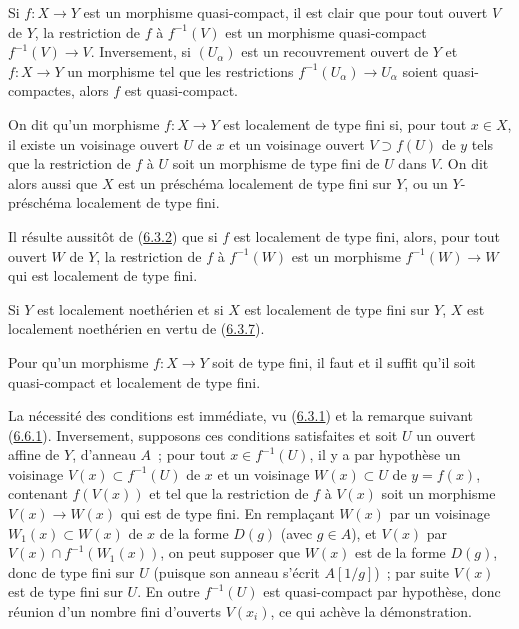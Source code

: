 Si $f:X\to Y$ est un morphisme quasi-compact, il est clair que pour tout
ouvert $V$ de $Y$, la restriction de $f$ à $f^{-1}(V)$ est un morphisme
quasi-compact $f^{-1}(V)\to V$. Inversement, si $(U_\alpha)$ est un
recouvrement ouvert de $Y$ et $f:X\to Y$ un morphisme tel que les restrictions
$f^{-1}(U_\alpha)\to U_\alpha$ soient quasi-compactes, alors $f$ est
quasi-compact.

\begin{definition}[6.6.2]
\label{I.6.6.2-fr}
On dit qu'un morphisme $f:X\to Y$ est localement de type fini si, pour
tout $x\in X$, il existe un voisinage ouvert $U$ de $x$ et un voisinage ouvert
$V\supset f(U)$ de $y$ tels que la
restriction de $f$ à $U$ soit un morphisme de type fini de $U$ dans $V$. On
dit alors aussi que $X$ est un préschéma localement de type fini sur $Y$, ou
un $Y$-préschéma localement de type fini.
\end{definition}

Il résulte aussitôt de (\hyperref[I.6.3.2-fr]{6.3.2}) que si $f$ est
localement de type fini, alors, pour tout ouvert $W$ de $Y$, la restriction
de $f$ à $f^{-1}(W)$ est un morphisme $f^{-1}(W)\to W$ qui est localement de
type fini.

Si $Y$ est localement noethérien et si $X$ est localement de type fini sur
$Y$, $X$ est localement noethérien en vertu de
(\hyperref[I.6.3.7-fr]{6.3.7}).

\begin{proposition}[6.6.3]
\label{I.6.6.3-fr}
Pour qu'un morphisme $f:X\to Y$ soit de type fini, il faut et il suffit qu'il
soit quasi-compact et localement de type fini.
\end{proposition}

La nécessité des conditions est immédiate, vu
(\hyperref[I.6.3.1-fr]{6.3.1}) et la remarque suivant
(\hyperref[I.6.6.1-fr]{6.6.1}). Inversement, supposons ces conditions
satisfaites et soit $U$ un ouvert affine de $Y$, d'anneau $A$~; pour tout
$x\in f^{-1}(U)$, il y a par hypothèse un voisinage
$V(x)\subset f^{-1}(U)$ de $x$ et un voisinage $W(x)\subset U$ de
$y=f(x)$, contenant $f(V(x))$ et tel que la restriction de $f$ à $V(x)$ soit
un morphisme $V(x)\to W(x)$ qui est de type fini. En remplaçant $W(x)$ par
un voisinage $W_1(x)\subset W(x)$ de $x$ de la forme $D(g)$ (avec $g\in A$),
et $V(x)$ par $V(x)\cap f^{-1}(W_1(x))$, on peut supposer que $W(x)$ est de
la forme $D(g)$, donc de type fini sur $U$ (puisque son anneau s'écrit
$A[1/g]$)~; par suite $V(x)$ est de type fini sur $U$. En outre
$f^{-1}(U)$ est quasi-compact par hypothèse, donc réunion d'un nombre fini
d'ouverts $V(x_i)$, ce qui achève la démonstration.

